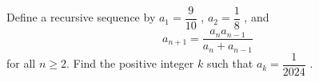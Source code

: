 Define a recursive sequence by $a_1 = \dfrac{9}{10}$ , $a_2 = \dfrac{1}{8}$ , and \[a_{n+1} =\dfrac{a_na_{n-1}}{a_n + a_{n-1}}\]for all $n \ge 2$. Find the positive integer $k$ such that $a_k = \dfrac{1}{2024}$ .
